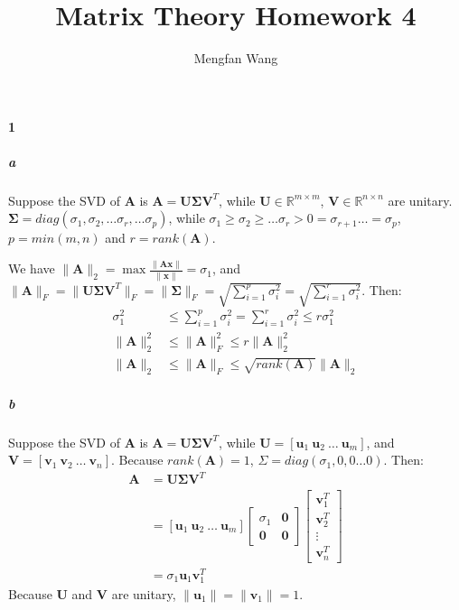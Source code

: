 \documentclass[22pt]{article}
\author{Mengfan Wang}
\title{Matrix Theory Homework 4}
\begin{document}
	\maketitle 
	\paragraph{1} 
		\subparagraph{a} Suppose the SVD of $\mathbf{A}$ is $\mathbf{A} = \mathbf{U \Sigma V}^T$, while $\mathbf{U} \in \mathbb{R}^{m\times m}$, $\mathbf{V} \in \mathbb{R}^{n \times n} $ are unitary. $\mathbf{\Sigma} = diag(\sigma_1,\sigma_2, \dots \sigma_r, \dots \sigma_p)$, while $\sigma_1\geq \sigma_2 \geq \dots \sigma_r > 0 = \sigma_{r+1} \dots = \sigma_p$, $ p = min(m,n)$ and $r = rank(\mathbf{A})$.

		We have $\|\mathbf{A}\|_2 = \max \frac{\|\mathbf{Ax}\|}{\|\mathbf{x}\|} = \sigma_1$, and $\|\mathbf{A}\|_F = \|\mathbf{U \Sigma V}^T\|_F = \|\mathbf{\Sigma}\|_F = \sqrt{\sum\limits_{i=1}^{p}\sigma_i^2} = \sqrt{\sum\limits_{i=1}^{r}\sigma_i^2}$. Then:
		\begin{align}
			\sigma_1^2 & \leq \sum\limits_{i=1}^{p}\sigma_i^2 = \sum\limits_{i=1}^{r}\sigma_i^2  \leq r \sigma_1^2\\
			\|\mathbf{A}\|_2^2 & \leq \|\mathbf{A}\|_F^2 \leq r\|\mathbf{A}\|_2^2\\
			\|\mathbf{A}\|_2 & \leq \|\mathbf{A}\|_F \leq \sqrt{rank(\mathbf{A})} \|\mathbf{A}\|_2
		\end{align}

	\subparagraph{b}  Suppose the SVD of $\mathbf{A}$ is $\mathbf{A} = \mathbf{U \Sigma V}^T$, while $\mathbf{U} = [\mathbf{u}_1\ \mathbf{u}_2\ \dots\ \mathbf{u}_m]$, and $\mathbf{V} = [\mathbf{v}_1\ \mathbf{v}_2\ \dots\ \mathbf{v}_n]$.
	Because $rank(\mathbf{A}) = 1$, $\Sigma = diag(\sigma_1,0,0\dots 0)$. Then:
	\begin{align}
		\mathbf{A} & = \mathbf{U \Sigma V}^T\\
		& = [\mathbf{u}_1\ \mathbf{u}_2\ \dots\ \mathbf{u}_m]\left[\begin{array}{cc} \sigma_1 & \mathbf{0}\\ \mathbf{0} & \mathbf{0} \end{array}\right]\left[\begin{array}{c} \mathbf{v}_1^T \\ \mathbf{v}_2^T \\ \vdots \\\mathbf{v}_n^T \end{array}\right]\\
		& = \sigma_1 \mathbf{u}_1 \mathbf{v}_1^T
	\end{align}
	Because $\mathbf{U}$ and $\mathbf{V}$ are unitary, $\|\mathbf{u}_1\| = \|\mathbf{v}_1\| =1$.
\end{document}
